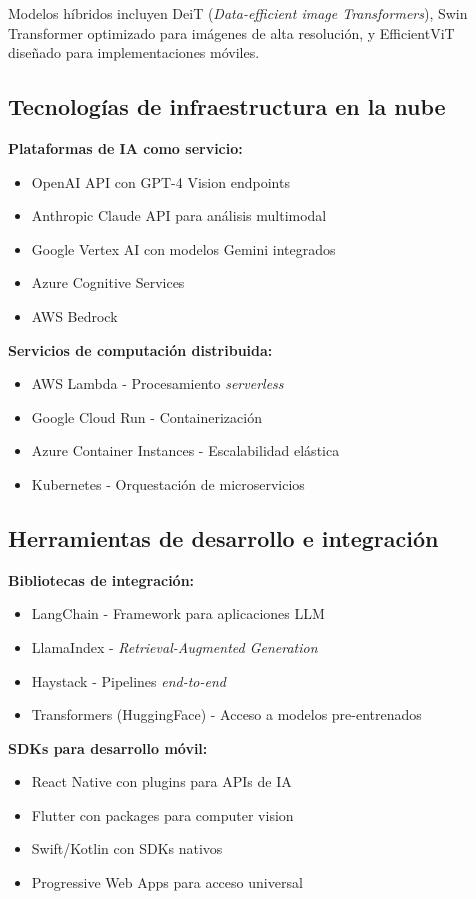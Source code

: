 Modelos híbridos incluyen DeiT (\textit{Data-efficient image Transformers}), Swin Transformer optimizado para imágenes de alta resolución, y EfficientViT diseñado para implementaciones móviles.

\subsection{Tecnologías de infraestructura en la nube}

\textbf{Plataformas de IA como servicio:}
\begin{itemize}
    \item OpenAI API con GPT-4 Vision endpoints
    \item Anthropic Claude API para análisis multimodal
    \item Google Vertex AI con modelos Gemini integrados
    \item Azure Cognitive Services
    \item AWS Bedrock
\end{itemize}

\textbf{Servicios de computación distribuida:}
\begin{itemize}
    \item AWS Lambda - Procesamiento \textit{serverless}
    \item Google Cloud Run - Containerización
    \item Azure Container Instances - Escalabilidad elástica
    \item Kubernetes - Orquestación de microservicios
\end{itemize}

\subsection{Herramientas de desarrollo e integración}

\textbf{Bibliotecas de integración:}
\begin{itemize}
    \item LangChain - Framework para aplicaciones LLM
    \item LlamaIndex - \textit{Retrieval-Augmented Generation}
    \item Haystack - Pipelines \textit{end-to-end}
    \item Transformers (HuggingFace) - Acceso a modelos pre-entrenados
\end{itemize}

\textbf{SDKs para desarrollo móvil:}
\begin{itemize}
    \item React Native con plugins para APIs de IA
    \item Flutter con packages para computer vision
    \item Swift/Kotlin con SDKs nativos
    \item Progressive Web Apps para acceso universal
\end{itemize}

